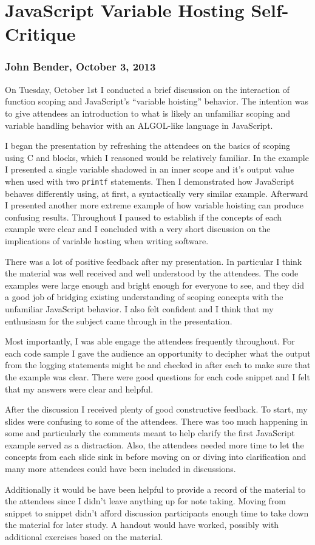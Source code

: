 \documentclass[pdftex,12pt,a4paper]{report}
\begin{document}
\section{JavaScript Variable Hosting Self-Critique}
\subsubsection{John Bender, October 3, 2013}

On Tuesday, October 1st I conducted a brief discussion on the interaction of function scoping and JavaScript's ``variable hoisting'' behavior. The intention was to give attendees an introduction to what is likely an unfamiliar scoping and variable handling behavior with an ALGOL-like language in JavaScript.

I began the presentation by refreshing the attendees on the basics of scoping using C and blocks, which I reasoned would be relatively familiar. In the example I presented a single variable shadowed in an inner scope and it's output value when used with two \verb|printf| statements. Then I demonstrated how JavaScript behaves differently using, at first, a syntactically very similar example. Afterward I presented another more extreme example of how variable hoisting can produce confusing results. Throughout I paused to establish if the concepts of each example were clear and I concluded with a very short discussion on the implications of variable hosting when writing software.

There was a lot of positive feedback after my presentation. In particular I think the material was well received and well understood by the attendees. The code examples were large enough and bright enough for everyone to see, and they did a good job of bridging existing understanding of scoping concepts with the unfamiliar JavaScript behavior. I also felt confident and I think that my enthusiasm for the subject came through in the presentation.

Most importantly, I was able engage the attendees frequently throughout. For each code sample I gave the audience an opportunity to decipher what the output from the logging statements might be and checked in after each to make sure that the example was clear. There were good questions for each code snippet and I felt that my answers were clear and helpful.

After the discussion I received plenty of good constructive feedback. To start, my slides were confusing to some of the attendees. There was too much happening in some and particularly the comments meant to help clarify the first JavaScript example served as a distraction. Also, the attendees needed more time to let the concepts from each slide sink in before moving on or diving into clarification and many more attendees could have been included in discussions.

Additionally it would be have been helpful to provide a record of the material to the attendees since I didn't leave anything up for note taking. Moving from snippet to snippet didn't afford discussion participants enough time to take down the material for later study. A handout would have worked, possibly with additional exercises based on the material.
\end{document}
